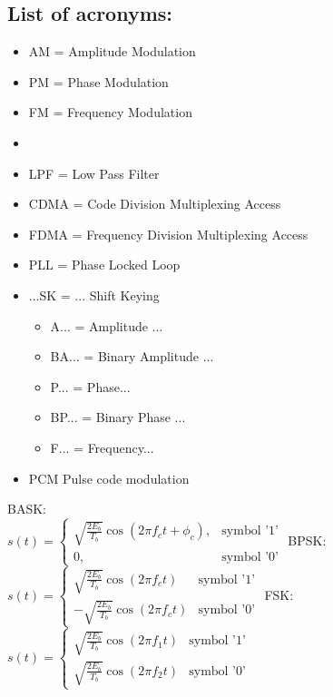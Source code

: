 \documentclass[10pt,landscape,a4paper]{article}
\begin{document}
	\begin{multicols*}{4}
		\section*{List of acronyms:}
		\begin{itemize}
			\item AM = Amplitude Modulation
			\item PM = Phase Modulation
			\item FM = Frequency Modulation
			\item 
			\item LPF = Low Pass Filter
			\item CDMA = Code Division Multiplexing Access
			\item FDMA = Frequency Division Multiplexing Access
			\item PLL = Phase Locked Loop
			\item ...SK = ... Shift Keying
			\begin{itemize}
				\item A... = Amplitude ...
				\item BA... = Binary Amplitude ...
				\item P... = Phase...
				\item BP... = Binary Phase ...
				\item F... = Frequency...
			\end{itemize}
			\item PCM Pulse code modulation
		\end{itemize}
		BASK:\\
		$ s(t) = \left\{
		\begin{array}{ll}
		\sqrt{\frac{2E_b}{T_b}}\cos(2\pi f_c t + \phi_c), & \text{symbol '1'}\\
		0, & \text{symbol '0'}
		\end{array}\right. $
		BPSK:\\
		$ s(t) = \left\{
		\begin{array}{ll}
		\sqrt{\frac{2E_b}{T_b}}\cos(2\pi f_ct) & \text{symbol '1'}\\
		-\sqrt{\frac{2E_b}{T_b}}\cos(2\pi f_ct) & \text{symbol '0'}
		\end{array}\right. $
		FSK:\\
		$ s(t) = \left\{
		\begin{array}{ll}
		\sqrt{\frac{2E_b}{T_b}}\cos(2\pi f_1t) & \text{symbol '1'}\\
		\sqrt{\frac{2E_b}{T_b}}\cos(2\pi f_2t) & \text{symbol '0'}
		\end{array}\right. $

\end{multicols*}
\end{document}
